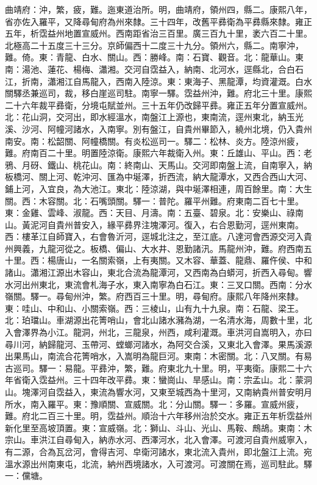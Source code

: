 \begin{pinyinscope}
曲靖府：沖，繁，疲，難。迤東道治所。明，曲靖府，領州四，縣二。康熙八年，省亦佐入羅平，又降尋甸府為州來隸。三十四年，改舊平彞衛為平彞縣來隸。雍正五年，析霑益州地置宣威州。西南距省治三百里。廣三百九十里，袤六百二十里。北極高二十五度三十三分。京師偏西十二度三十九分。領州六，縣二。南寧沖，難。倚。東：青龍、白水、關山。西：勝峰。南：石寶、觀音。北：龍華山。東南：湯池、蓮花、楊梅、瀟湘。交河自霑益入，納南、北河水，逕縣北，合白石江，折南，瀟湘江自馬龍入，西南入陸涼。東：東海子、黑龍潭，均資灌溉。白水關驛丞兼巡司，裁，移白崖巡司駐。南寧一驛。霑益州沖，難。府北三十里。康熙二十六年裁平彞衛，分境屯賦並州。三十五年仍改歸平彞。雍正五年分置宣威州。北：花山洞，交河出，即水經溫水，南盤江上源也，東南流，逕州東北，納玉光溪、沙河、阿幢河諸水，入南寧。別有盤江，自貴州畢節入，繞州北境，仍入貴州南安。南：松韶關、阿幢橋關。有炎松巡司一。驛二：松林、炎方。陸涼州疲，難。府南百二十里。明置陸涼衛。康熙六年裁衛入州。東：丘雄山、平山。西：老鴉、月砑、鐵山、桃花山。南：終南山、天馬山。交河即南盤上流，自南寧入，納板橋河、關上河、乾沖河、匯為中埏澤，折西流，納大龍潭水，又西合西山大河、鋪上河，入宜良，為大池江。東北：陸涼湖，與中埏澤相連，周百餘里。南：大生關。西：木容關。北：石嘴頭關。驛一：普陀。羅平州難。府東南二百七十里。東：金雞、雲峰、淑龍。西：天目、月濤。南：五臺、碧泉。北：安樂山、祿南山。黃泥河自貴州普安入，緣平彞界注塊澤河。復入，右合恩勤河，逕州東南。西：樓革江自師寶入，右會魯沂河，逕城北注之，至江底。八達河會西源交河入貴州興義，九龍河從之。板橋、偏山、大水井、恩勤諸汛。馬龍州沖，難。府西南五十里。西：楊唐山，一名關索嶺，上有夷關。又木容、華蓋、龍鼎、羅仵侯、中和諸山。瀟湘江源出木容山，東北合流為龍潭河，又西南為白蟒河，折西入尋甸。響水河出州東北，東流會札海子水，東入南寧為白石江。東：三叉口關。西南：分水嶺關。驛一。尋甸州沖，繁。府西百三十里。明，尋甸府。康熙八年降州來隸。東：哇山、中和山、小關索嶺。西：三棱山，山有九十九泉。南：石龍、梁王。北：珀璫山。車湖源出花箐哨山，會北山諸水瀦為湖，一名清水海，周數十里，北入會澤界為小江。龍洞，州北，三龍泉，州西，咸利灌溉。車洪河自嵩明入，亦曰尋川河，納歸龍河、玉帶河、螳螂河諸水，為阿交合溪，又東北入會澤。果馬溪源出果馬山，南流合花箐哨水，入嵩明為龍巨河。東南：木密關。北：八叉關。有易古巡司。驛一：易龍。平彞沖，繁，難。府東北九十里。明，平夷衛。康熙二十六年省衛入霑益州。三十四年改平彞。東：蠻崗山、旱感山。南：宗孟山。北：蒙洞山。塊澤河自霑益入，東流為響水河，又東至城西為十里河，又南納貴州普安明月所水，南入羅平。東：豫順關、宣威關。北：分山關。驛一：多羅。宣威州疲，難。府北二百三十里。明，霑益州。順治十六年移州治於交水。雍正五年析霑益州新化里至高坡頂置。東：宣威嶺。北：獅山、斗山、光山、馬鞍、鷓鴣。東南：木宗山。車洪江自尋甸入，納赤水河、西澤河水，北入會澤。可渡河自貴州威寧入，有二源，合為瓦岔河，會得吉河、皁衛河諸水，東北流入貴州，即北盤江上流。宛溫水源出州南東屯，北流，納州西境諸水，入可渡河。可渡關在焉，巡司駐此。驛一：儻塘。


\end{pinyinscope}
